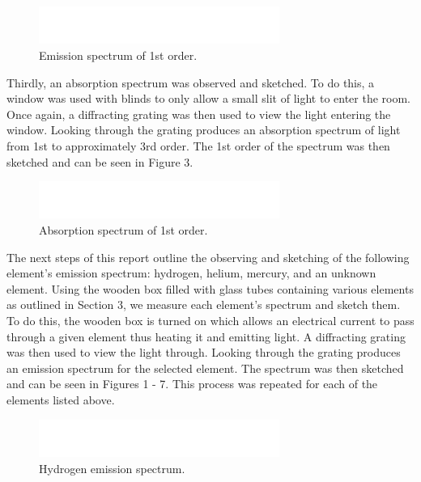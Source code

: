 \documentclass{article}
\begin{document}
\begin{figure}[h]
\centering
\includegraphics[width=0.7\textwidth]{images/BlankSpectrum}
\caption{Emission spectrum of 1st order.\label{fig:cont}}
\end{figure}

Thirdly, an absorption spectrum was observed and sketched. To do this, a window was
used with blinds to only allow a small slit of light to enter the room. Once again,
a diffracting grating was then used to view the light entering the window. Looking
through the grating produces an absorption spectrum of light from 1st to approximately
3rd order. The 1st order of the spectrum was then sketched and can be seen in Figure 3.\\

\begin{figure}[h]
\centering
\includegraphics[width=0.7\textwidth]{images/BlankSpectrum}
\caption{Absorption spectrum of 1st order.\label{fig:cont}}
\end{figure}

The next steps of this report outline the observing and sketching of the following
element's emission spectrum: hydrogen, helium, mercury, and an unknown element. 
Using the wooden box filled with glass tubes containing various elements as outlined
in Section 3, we measure each element's spectrum and sketch them. To do this, the wooden
box is turned on which allows an electrical current to pass through a given element thus
heating it and emitting light. A diffracting grating was then used to view the light
through. Looking through the grating produces an emission spectrum for the selected 
element. The spectrum was then sketched and can be seen in Figures 1 - 7. This process 
was repeated for each of the elements listed above.\\

\begin{figure}[h]
\centering
\includegraphics[width=0.7\textwidth]{images/BlankSpectrum}
\caption{Hydrogen emission spectrum.\label{fig:cont}}
\end{figure}
\end{document}
